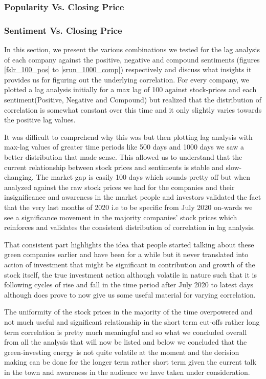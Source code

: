 \documentclass[sigconf, nonacm]{acmart}
\begin{document}
\subsubsection{Popularity Vs. Closing Price}
\subsubsection{Sentiment Vs. Closing Price}
In this section, we present the various combinations we tested for the lag analysis of each company against the positive, negative and compound sentiments (figures \ref{fslr_100_pos} to \ref{srun_1000_comp}) respectively and discuss what insights it provides us for figuring out the underlying correlation. For every company,  we plotted a lag analysis initially for a max lag of 100 against stock-prices and each sentiment(Positive, Negative and Compound) but realized that the distribution of correlation is somewhat constant over this time and it only slightly varies towards the positive lag values. \newline

It was difficult to comprehend why this was but then plotting lag analysis with max-lag values of greater time periods like 500 days and 1000 days we saw a better distribution that made sense. This allowed us to understand that the current relationship between stock prices and sentiments is stable and slow-changing. The market gap is easily 100 days which sounds pretty off but when analyzed against the raw stock prices we had for the companies and their insignificance and awareness in the market people and investors validated the fact that the very last months of 2020 i.e to be specific from July 2020 on-wards we see a significance movement in the majority companies' stock prices which reinforces and validates the consistent distribution of correlation in lag analysis. \newline

That consistent part highlights the idea that people started talking about these green companies earlier and have been for a while but it never translated into action of investment that might be significant in contribution and growth of the stock itself, the true investment action although volatile in nature such that it is following cycles of rise and fall in the time period after July 2020 to latest days although does prove to now give us some useful material for varying correlation. \newline

The uniformity of the stock prices in the majority of the time overpowered and not much useful and significant relationship in the short term cut-offs rather long term correlation is pretty much meaningful and so what we concluded overall from all the analysis that will now be listed and below we concluded that the green-investing energy is not quite volatile at the moment and the decision making can be done for the longer term rather short term given the current talk in the town and awareness in the audience we have taken under consideration. \newline 
\end{document}
